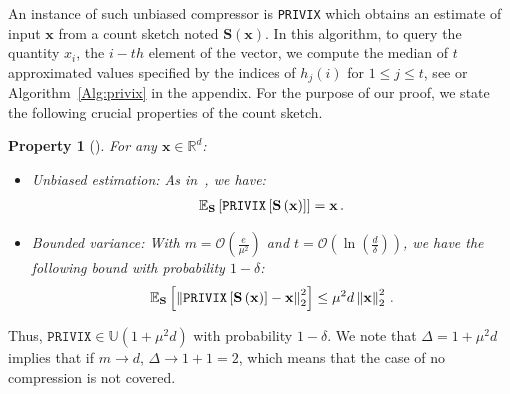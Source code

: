 \documentclass[twoside]{article}
\newtheorem{property}{Property}
\begin{document}
An instance of such unbiased compressor is \texttt{PRIVIX} which obtains an estimate of input $\boldsymbol{x}$ from a count sketch noted $\boldsymbol{S}(\boldsymbol{x})$. 
In this algorithm, to query the quantity $x_i$, the $i-th$ element of the vector, we compute the median of $t$ approximated values specified by the indices of $h_j(i)$ for $1\leq j\leq t$, see \cite{li2019privacy} or Algorithm~\ref{Alg:privix} in the appendix.
For the purpose of our proof, we state the following crucial properties of the count sketch.
\begin{property}[\cite{li2019privacy}]
For any $\mathbf{x}\in \mathbb{R}^{d}$:
\begin{itemize}
    \item[1)] \emph{Unbiased estimation}: As in~\cite{li2019privacy}, we have:
    \begin{align}\notag
        \mathbb{E}_{\mathbf{S}}\left[\texttt{PRIVIX}\left[\mathbf{S}\left(\mathbf{x}\right)\right]\right]=\mathbf{x}\, .
    \end{align}
    \item[2)] \emph{Bounded variance}: With $m=\mathcal{O}\left(\frac{e}{\mu^2}\right)$ and $t=\mathcal{O}\left(\ln \left(\frac{d}{\delta}\right)\right)$, we have the following bound with probability $1-\delta$:
    \begin{align}\notag
        \mathbb{E}_{\mathbf{S}}\left[\left\|\texttt{PRIVIX}\left[\mathbf{S}\left(\mathbf{x}\right)\right]-\mathbf{x}\right\|_2^2\right]\leq \mu^2 d\left\|\mathbf{x}\right\|_2^2\, .
    \end{align}
\end{itemize}
\end{property}
Thus, $\texttt{PRIVIX}\in \mathbb{U}(1+\mu^2 d)$ with probability $1-\delta$.
We note that $\Delta=1+\mu^2d$ implies that if $m\rightarrow d$, $\Delta\rightarrow 1+1=2$, which means that the case of no compression is not covered. 
\end{document}

